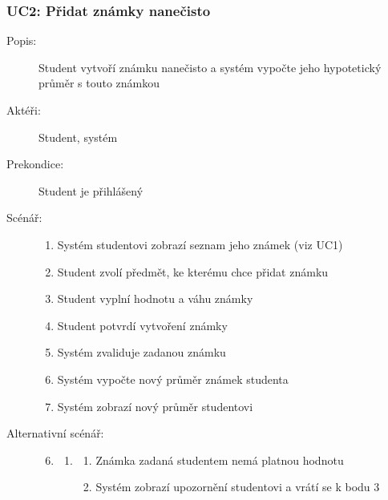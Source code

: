 \documentclass[a4paper,10pt,titlepage]{article}
\begin{document}
	\subsubsection*{UC2: Přidat známky nanečisto}
	\begin{description}
		\item[Popis:] Student vytvoří známku nanečisto a systém vypočte jeho hypotetický průměr s touto známkou
		\item[Aktéři:] Student, systém
		\item[Prekondice:] Student je přihlášený
		\item[Scénář:] \hfill
				\begin{enumerate}
					\item Systém studentovi zobrazí seznam jeho známek (viz UC1)
					\item Student zvolí předmět, ke kterému chce přidat známku
					\item Student vyplní hodnotu a váhu známky
					\item Student potvrdí vytvoření známky
					\item Systém zvaliduje zadanou známku
					\item Systém vypočte nový průměr známek studenta
					\item Systém zobrazí nový průměr studentovi
				\end{enumerate}
		\item[Alternativní scénář:] \hfill
				\begin{enumerate}
					\setcounter{enumi}{5}
					\setcounter{enumii}{1}
					\item \begin{enumerate}[label*=\arabic*.,leftmargin=8pt]
						\item
							\begin{enumerate}[label=\alph*.]
								\item Známka zadaná studentem nemá platnou hodnotu
								\item Systém zobrazí upozornění studentovi a vrátí se k bodu 3
							\end{enumerate}
					\end{enumerate}		
				\end{enumerate}
	\end{description}
\end{document}
